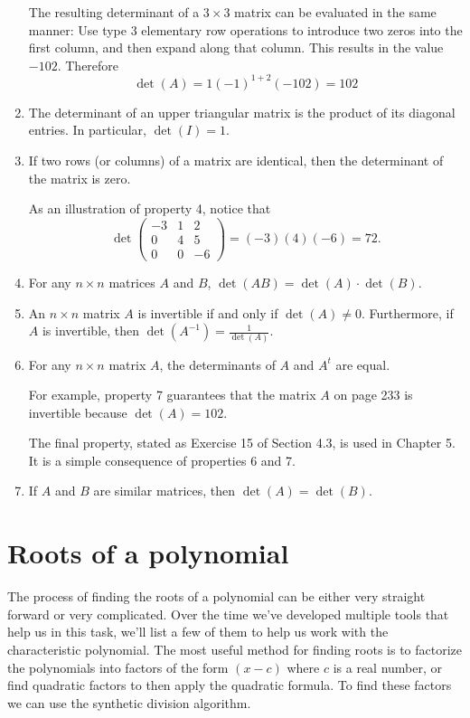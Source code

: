 \documentclass{report}
\begin{document}
\begin{enumerate}
        The resulting determinant of a $3 \times 3$ matrix can be evaluated in the same manner: Use type 3 elementary row operations to introduce two zeros into the first column, and then expand along that column. This results in the value $-102$. Therefore
        $$
        \operatorname{det}(A)=1(-1)^{1+2}(-102)=102
        $$

        \item The determinant of an upper triangular matrix is the product of its diagonal entries. In particular, $\operatorname{det}(I)=1$.

        \item If two rows (or columns) of a matrix are identical, then the determinant of the matrix is zero.

        As an illustration of property 4, notice that
        $$
        \operatorname{det}\left(\begin{array}{rrr}
        -3 & 1 & 2 \\
        0 & 4 & 5 \\
        0 & 0 & -6
        \end{array}\right)=(-3)(4)(-6)=72.
        $$

        \item For any $n \times n$ matrices $A$ and $B$, $\operatorname{det}(A B)=\operatorname{det}(A) \cdot \operatorname{det}(B)$.

        \item An $n \times n$ matrix $A$ is invertible if and only if $\operatorname{det}(A) \neq 0$. Furthermore, if $A$ is invertible, then $\operatorname{det}\left(A^{-1}\right)=\frac{1}{\operatorname{det}(A)}$.

        \item For any $n \times n$ matrix $A$, the determinants of $A$ and $A^{t}$ are equal.

        For example, property 7 guarantees that the matrix $A$ on page 233 is invertible because $\operatorname{det}(A)=102$.

        The final property, stated as Exercise 15 of Section 4.3, is used in Chapter 5. It is a simple consequence of properties 6 and 7.

        \item If $A$ and $B$ are similar matrices, then $\operatorname{det}(A)=\operatorname{det}(B)$.
    \end{enumerate}


    \section{Roots of a polynomial}
    The process of finding the roots of a polynomial can be either very straight forward or very complicated. Over the time we've developed multiple tools that help us in this task, we'll list a few of them to help us work with the characteristic polynomial. The most useful method for finding roots is to factorize the polynomials into factors of the form $(x - c)$ where $c$ is a real number, or find quadratic factors to then apply the quadratic formula. To find these factors we can use the synthetic division algorithm.
\end{document}
